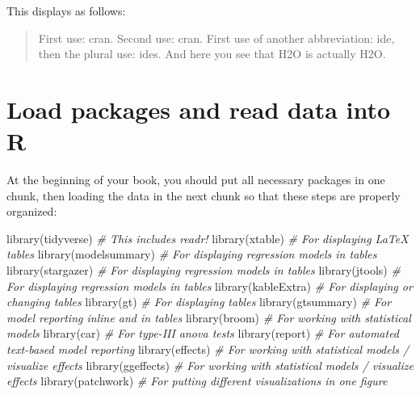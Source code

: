 \documentclass[
  11pt,
  a4paper,
  twoside]{scrbook}
\newenvironment{Shaded}{\begin{snugshade}}{\end{snugshade}}
\newcommand{\CommentTok}[1]{\textcolor[rgb]{0.56,0.35,0.01}{\textit{#1}}}
\newcommand{\FunctionTok}[1]{\textcolor[rgb]{0.00,0.00,0.00}{#1}}
\newcommand{\NormalTok}[1]{#1}
\begin{document}
This displays as follows:

\begin{quote}
First use: \Ac{cran}. Second use: \ac{cran}.
First use of another abbreviation: \ac{ide}, then the plural use: \acp{ide}.
And here you see that \acs{H2O} is actually \ac{H2O}.
\end{quote}

\hypertarget{read-data}{%
\section{Load packages and read data into R}\label{read-data}}

At the beginning of your book, you should put all necessary packages in one chunk, then loading the data in the next chunk so that these steps are properly organized:

\linespread{1}

\begin{Shaded}
\begin{Highlighting}[]
\FunctionTok{library}\NormalTok{(tidyverse) }\CommentTok{\# This includes readr!}
\FunctionTok{library}\NormalTok{(xtable) }\CommentTok{\# For displaying LaTeX tables}
\FunctionTok{library}\NormalTok{(modelsummary) }\CommentTok{\# For displaying regression models in tables}
\FunctionTok{library}\NormalTok{(stargazer) }\CommentTok{\# For displaying regression models in tables}
\FunctionTok{library}\NormalTok{(jtools) }\CommentTok{\# For displaying regression models in tables}
\FunctionTok{library}\NormalTok{(kableExtra) }\CommentTok{\# For displaying or changing tables}
\FunctionTok{library}\NormalTok{(gt) }\CommentTok{\# For displaying tables}
\FunctionTok{library}\NormalTok{(gtsummary) }\CommentTok{\# For model reporting inline and in tables}
\FunctionTok{library}\NormalTok{(broom) }\CommentTok{\# For working with statistical models}
\FunctionTok{library}\NormalTok{(car) }\CommentTok{\# For type{-}III anova tests}
\FunctionTok{library}\NormalTok{(report) }\CommentTok{\# For automated text{-}based model reporting}
\FunctionTok{library}\NormalTok{(effects) }\CommentTok{\# For working with statistical models / visualize effects}
\FunctionTok{library}\NormalTok{(ggeffects) }\CommentTok{\# For working with statistical models / visualize effects}
\FunctionTok{library}\NormalTok{(patchwork) }\CommentTok{\# For putting different visualizations in one figure}
\end{Highlighting}
\end{Shaded}

\linespread{1}
\end{document}
